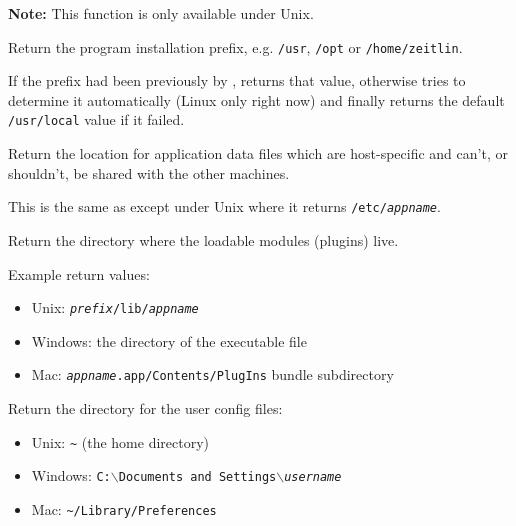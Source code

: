 \textbf{Note: } This function is only available under Unix.

Return the program installation prefix, e.g. \texttt{/usr}, \texttt{/opt} or 
\texttt{/home/zeitlin}.

If the prefix had been previously by 
, returns that
value, otherwise tries to determine it automatically (Linux only right
now) and finally returns the default \texttt{/usr/local} value if it failed.


\label{wxstandardpathsgetlocaldatadir}


Return the location for application data files which are host-specific and
can't, or shouldn't, be shared with the other machines.

This is the same as  except
under Unix where it returns \texttt{/etc/\textit{appname}}.


\label{wxstandardpathsgetpluginsdir}


Return the directory where the loadable modules (plugins) live.

Example return values:
\begin{itemize}
    \item Unix: \texttt{\textit{prefix}/lib/\textit{appname}}
    \item Windows: the directory of the executable file
    \item Mac: \texttt{\textit{appname}.app/Contents/PlugIns} bundle subdirectory
\end{itemize}




\label{wxstandardpathsgetuserconfigdir}


Return the directory for the user config files:
\begin{itemize}
    \item Unix: \texttt{\verb|~|} (the home directory)
    \item Windows: \texttt{C:$\backslash$Documents and Settings$\backslash$\textit{username}}
    \item Mac: \texttt{\verb|~|/Library/Preferences}
\end{itemize}

